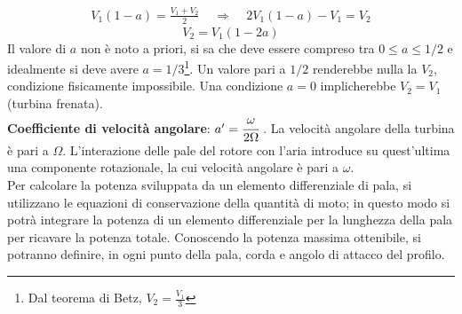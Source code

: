\begin{align*}
V_1 (1-a) = \frac{V_1 +V_2}{2} \;\;\;\; \Rightarrow \;\;\;\; 2 V_1 (1-a) - V_1 = V_2
\end{align*}
\begin{equation}
\boxed{V_2 = V_1 (1-2a)}
\end{equation}
Il valore di $a$ non è noto a priori, si sa che deve essere compreso tra $0 \leq a \leq 1/2$ e idealmente si deve avere $a = 1/3$\footnote{Dal teorema di Betz, $V_2=\frac{V_1}{3}$}. Un valore pari a $1/2$ renderebbe nulla la $V_2$, condizione fisicamente impossibile. Una condizione $a=0$ implicherebbe $V_2 = V_1$ (turbina frenata).\\
\textbf{Coefficiente di velocità angolare}: $a' = \cfrac{\omega}{2 \Omega}$ .
La velocità angolare della turbina è pari a $\Omega$. L'interazione delle pale del rotore con l'aria introduce su quest'ultima una componente rotazionale, la cui velocità angolare è pari a $\omega$.\\[2mm]

Per calcolare la potenza sviluppata da un elemento differenziale di pala, si utilizzano le equazioni di conservazione della quantità di moto; in questo modo si potrà integrare la potenza di un elemento differenziale per la lunghezza della pala per ricavare la potenza totale. Conoscendo la potenza massima ottenibile, si potranno definire, in ogni punto della pala, corda e angolo di attacco del profilo.


